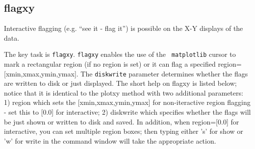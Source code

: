 \subsection{flagxy}
\label{subsection:flagxy}

Interactive flagging (e.g. ``see it - flag it'') is possible on the
X-Y displays of the data.

The key task is {\tt flagxy}. {\tt flagxy} enables the use of the {\tt
matplotlib} cursor to mark a rectangular region (if no region is set)
or it can flag a specified region=[xmin,xmax,ymin,ymax]. The
{\tt diskwrite} parameter determines whether the flags are written to disk
or just displayed. The short help on flagxy is listed below; notice
that it is identical to the plotxy method with two additional
parameters: 1) region which sets the [xmin,xmax,ymin,ymax] for
non-iteractive region flagging - set this to [0.0] for interactive; 2)
diskwrite which specifies whether the flags will be just shown or
written to disk and saved. In addition, when region=[0.0] for
interactive, you can set multiple region boxes; then typing either 's'
for show or 'w' for write in the command window will take the
appropriate action.

